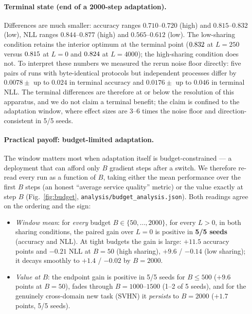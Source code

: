 \documentclass[review,12pt]{elsarticle}
\begin{document}
\paragraph{Terminal state (end of a 2000-step adaptation).}
Differences are much smaller: accuracy ranges $0.710$--$0.720$ (high) and
$0.815$--$0.832$ (low), NLL ranges $0.844$--$0.877$ (high) and
$0.565$--$0.612$ (low). The low-sharing condition retains the interior
optimum at the terminal point ($0.832$ at $L{=}250$ versus $0.815$
at $L{=}0$ and $0.824$ at $L{=}4000$); the high-sharing condition does
not. To interpret these numbers we measured the rerun noise floor directly:
five pairs of runs with byte-identical protocols but independent processes
differ by $0.0078\pm$ up to $0.024$ in terminal accuracy and $0.0176\pm$ up to
$0.046$ in terminal NLL. The terminal differences are therefore at or below
the resolution of this apparatus, and we do not claim a terminal benefit; the
claim is confined to the adaptation window, where effect sizes are 3--6 times
the noise floor and direction-consistent in 5/5 seeds.

\paragraph{Practical payoff: budget-limited adaptation.}
The window matters most when adaptation itself is budget-constrained --- a
deployment that can afford only $B$ gradient steps after a switch. We
therefore re-read every run as a function of $B$, taking either the mean
performance over the first $B$ steps (an honest ``average service quality''
metric) or the value exactly at step $B$ (Fig.~\ref{fig:budget},
\texttt{analysis/budget\_analysis.json}). Both readings agree on the ordering
and the sign:

\begin{itemize}
  \item \emph{Window mean}: for \emph{every} budget $B\in\{50,\dots,2000\}$,
  for every $L>0$, in both sharing conditions, the paired gain over $L{=}0$ is
  positive in \textbf{5/5 seeds} (accuracy and NLL). At tight budgets the gain
  is large: $+11.5$ accuracy points and $-0.21$ NLL at $B{=}50$ (high sharing),
  $+9.6$ / $-0.14$ (low sharing); it decays smoothly to $+1.4$ / $-0.02$ by
  $B{=}2000$.
  \item \emph{Value at $B$}: the endpoint gain is positive in 5/5 seeds for
  $B\le500$ ($+9.6$ points at $B{=}50$), fades through $B{=}1000$--$1500$
  (1--2 of 5 seeds), and for the genuinely cross-domain new task (SVHN) it
  \emph{persists} to $B{=}2000$ ($+1.7$ points, 5/5 seeds).
\end{itemize}
\end{document}
